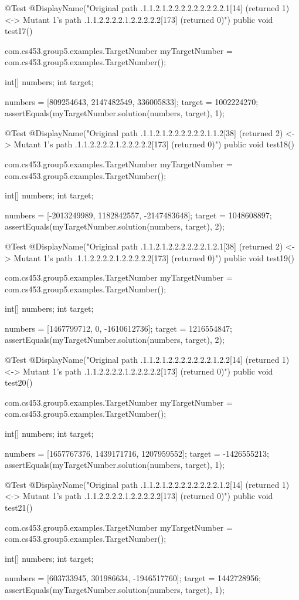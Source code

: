@Test
@DisplayName("Original path .1.1.2.1.2.2.2.2.2.2.2.2.2.1[14] (returned 1) <-> Mutant 1's path .1.1.2.2.2.2.1.2.2.2.2.2[173] (returned 0)")
public void test17() {
    com.cs453.group5.examples.TargetNumber myTargetNumber = com.cs453.group5.examples.TargetNumber();

    int[] numbers;
    int target;

    numbers = [809254643, 2147482549, 336005833];
    target = 1002224270;
    assertEquals(myTargetNumber.solution(numbers, target), 1);
}

@Test
@DisplayName("Original path .1.1.2.1.2.2.2.2.2.2.1.1.2[38] (returned 2) <-> Mutant 1's path .1.1.2.2.2.2.1.2.2.2.2.2[173] (returned 0)")
public void test18() {
    com.cs453.group5.examples.TargetNumber myTargetNumber = com.cs453.group5.examples.TargetNumber();

    int[] numbers;
    int target;

    numbers = [-2013249989, 1182842557, -2147483648];
    target = 1048608897;
    assertEquals(myTargetNumber.solution(numbers, target), 2);
}

@Test
@DisplayName("Original path .1.1.2.1.2.2.2.2.2.2.1.2.1[38] (returned 2) <-> Mutant 1's path .1.1.2.2.2.2.1.2.2.2.2.2[173] (returned 0)")
public void test19() {
    com.cs453.group5.examples.TargetNumber myTargetNumber = com.cs453.group5.examples.TargetNumber();

    int[] numbers;
    int target;

    numbers = [1467799712, 0, -1610612736];
    target = 1216554847;
    assertEquals(myTargetNumber.solution(numbers, target), 2);
}

@Test
@DisplayName("Original path .1.1.2.1.2.2.2.2.2.2.2.1.2.2[14] (returned 1) <-> Mutant 1's path .1.1.2.2.2.2.1.2.2.2.2.2[173] (returned 0)")
public void test20() {
    com.cs453.group5.examples.TargetNumber myTargetNumber = com.cs453.group5.examples.TargetNumber();

    int[] numbers;
    int target;

    numbers = [1657767376, 1439171716, 1207959552];
    target = -1426555213;
    assertEquals(myTargetNumber.solution(numbers, target), 1);
}

@Test
@DisplayName("Original path .1.1.2.1.2.2.2.2.2.2.2.2.1.2[14] (returned 1) <-> Mutant 1's path .1.1.2.2.2.2.1.2.2.2.2.2[173] (returned 0)")
public void test21() {
    com.cs453.group5.examples.TargetNumber myTargetNumber = com.cs453.group5.examples.TargetNumber();

    int[] numbers;
    int target;

    numbers = [603733945, 301986634, -1946517760];
    target = 1442728956;
    assertEquals(myTargetNumber.solution(numbers, target), 1);
}


